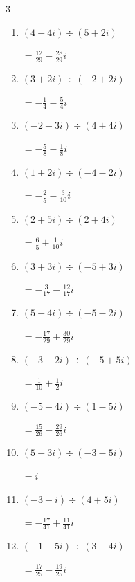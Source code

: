 \begin{multicols}{3}
\begin{enumerate}
  \item $\displaystyle (4-4i)\div(5+2i)$

        $\displaystyle =\frac{12}{29}-\frac{28}{29}i$

  \item $\displaystyle (3+2i)\div(-2+2i)$

        $\displaystyle =-\frac{1}{4}-\frac{5}{4}i$

  \item $\displaystyle (-2-3i)\div(4+4i)$

        $\displaystyle =-\frac{5}{8}-\frac{1}{8}i$

  \item $\displaystyle (1+2i)\div(-4-2i)$

        $\displaystyle =-\frac{2}{5}-\frac{3}{10}i$

  \item $\displaystyle (2+5i)\div(2+4i)$

        $\displaystyle =\frac{6}{5}+\frac{1}{10}i$

  \item $\displaystyle (3+3i)\div(-5+3i)$

        $\displaystyle =-\frac{3}{17}-\frac{12}{17}i$

  \item $\displaystyle (5-4i)\div(-5-2i)$

        $\displaystyle =-\frac{17}{29}+\frac{30}{29}i$

\columnbreak %

\resetques

  \item $\displaystyle (-3-2i)\div(-5+5i)$

        $\displaystyle =\frac{1}{10}+\frac{1}{2}i$

  \item $\displaystyle (-5-4i)\div(1-5i)$

        $\displaystyle =\frac{15}{26}-\frac{29}{26}i$

  \item $\displaystyle (5-3i)\div(-3-5i)$

        $\displaystyle =i$

  \item $\displaystyle (-3-i)\div(4+5i)$

        $\displaystyle =-\frac{17}{41}+\frac{11}{41}i$

  \item $\displaystyle (-1-5i)\div(3-4i)$

        $\displaystyle =\frac{17}{25}-\frac{19}{25}i$


\end{enumerate}
\end{multicols}
